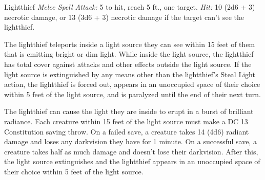 \documentclass[10pt,a4paper,twoside,bg=print,twocolumn,openany,nodeprecatedcode]{dndbook}
\begin{document}
\begin{DndMonster}[float=t]{Lightthief}
\DndMonsterBasics[
armor-class = {15 (natural armor)},
hit-points = {\DndDice{11d4 + 11}},
speed = {20 ft., fly 30 ft.}
]
\DndMonsterAbilityScores[
 str = 6,
 dex = 17,
 con = 12,
 int = 6,
 wis = 16,
 cha = 5
]
\DndMonsterDetails[
skills = {Perception +5, Stealth +5},
senses = {blindsight 60 ft., passive perception 15},
languages = {understands Abyssal, Common, and Infernal but can't speak},
challenge = 2,
]
\textsl{Melee Spell Attack:} 5 to hit, reach 5 ft., one target. \textsl{Hit:} 10 (2d6 + 3) necrotic damage, or 13 (3d6 + 3) necrotic damage if the target can't see the lightthief.

The lightthief teleports inside a light source they can see within 15 feet of them that is emitting bright or dim light. While inside the light source, the lightthief has total cover against attacks and other effects outside the light source. If the light source is extinguished by any means other than the lightthief's Steal Light action, the lightthief is forced out, appears in an unoccupied space of their choice within 5 feet of the light source, and is paralyzed until the end of their next turn.

The lightthief can cause the light they are inside to erupt in a burst of brilliant radiance. Each creature within 15 feet of the light source must make a DC 13 Constitution saving throw. On a failed save, a creature takes 14 (4d6) radiant damage and loses any darkvision they have for 1 minute. On a successful save, a creature takes half as much damage and doesn't lose their darkvision. After this, the light source extinguishes and the lightthief appears in an unoccupied space of their choice within 5 feet of the light source.

\end{DndMonster}
\end{document}
